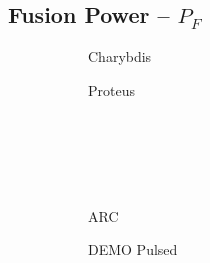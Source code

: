 \clearpage

\newpage

\subsection*{ Fusion Power -- $P_F$ }
  \label{subsection:scan_P_F}

\begin{figure*}[h!]
    \centering
    \hfill
    \begin{subfigure}[t]{0.45\textwidth}
        \centering
    \begin{adjustbox}{width=\textwidth}
      \Large
      
    \end{adjustbox}
        \caption{Charybdis}
    \end{subfigure}
    \hfill
    \begin{subfigure}[t]{0.45\textwidth}
        \centering
    \begin{adjustbox}{width=\textwidth}
      \Large
      
    \end{adjustbox}
        \caption{Proteus}
    \end{subfigure}
    \hfill \hfill ~\\ ~\\ ~\\ ~\\
    \hfill
    \begin{subfigure}[t]{0.45\textwidth}
        \centering
    \begin{adjustbox}{width=\textwidth}
      \Large
      
    \end{adjustbox}
        \caption{ARC}
    \end{subfigure}
    \hfill
    \begin{subfigure}[t]{0.45\textwidth}
        \centering
    \begin{adjustbox}{width=\textwidth}
      \Large
      
    \end{adjustbox}
        \caption{DEMO Pulsed}
    \end{subfigure}
    \hfill \hfill ~\\ ~\\ ~\\ ~\\
    \hfill
    \begin{subfigure}[t]{0.45\textwidth}
        \centering
    \begin{adjustbox}{width=\textwidth}

\end{adjustbox}
\end{subfigure}
\end{figure*}
